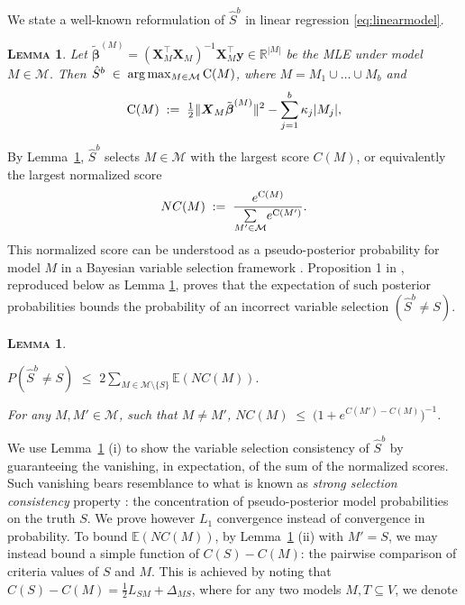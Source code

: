 \documentclass[aos]{imsart}
\theoremstyle{plain}
\newtheorem{lem}[thm]{\textsc{Lemma}}
\newcommand{\E}{\mathbb{E}}
\newcommand{\R}{\mathbb{R}}
\newcommand{\M}{\mathcal{M}}
\newcommand{\bs}{\boldsymbol}
\begin{document}
We state a well-known
reformulation of $\hat S^b$ in linear regression \eqref{eq:linearmodel}. 
\begin{lem}\label{lem:useful-reformulation} Let $\tilde{\bs \beta}^{(M)}= (\bs X_{\!\!M}^\top \bs X_{\!\!M})^{-1}\bs X_{\!\!M}^\top\bs y \in \R^{|M|}$ be the MLE under model $M\in \M$. Then $\hat S^b\;\in\;\arg\max_{M\in \M} {\rm C}(M)$, where $M=M_1\cup \ldots\cup M_b$ and
\begin{equation}\label{eq:CM}
    {\rm C}(M)\;: =\;\tfrac{1}{2}\|\bs X_M\tilde{\bs\beta}^{(M)}\|^2-\sum_{j=1}^b\kappa_j |M_j|,
\end{equation}
\end{lem}
By Lemma~\ref{lem:useful-reformulation}, $\hat S^b$ selects
$M\in \M$ with the largest score $C(M)$, or equivalently the largest normalized score
\begin{equation}\label{eq:normalizedscore}
    NC(M)\;:=\;\frac{e^{{\rm C}(M)}}{\underset{M' \in \M}{\sum} e^{{\rm C}(M')}}.
\end{equation}
This normalized score can be understood as a pseudo-posterior probability for model $M$ in a Bayesian variable selection framework \citep{BIC}.
Proposition 1 in \cite{rossell2022concentration}, reproduced below as Lemma \ref{lem:L0toL1convergence}, proves that the expectation of such posterior probabilities bounds the probability of an incorrect variable selection $(\hat S^b\neq S)$. 

\begin{lem}\label{lem:L0toL1convergence}
\begin{longlist}
\item 
$P(\hat{S}^{b} \neq S) \,\,\leq \,\, 2 \sum_{M \in \M\setminus \{S\}} \E\left(NC(M)\right).$
\item  For any $M,M'\in\M$, such that $M\neq M'$, 
$NC(M)\;\leq \;\big(1+e^{C(M')-C(M)}\big)^{-1}$.
\end{longlist}
\end{lem}
We use  Lemma~\ref{lem:L0toL1convergence} (i) to show the variable selection consistency of $\hat S^b$ by guaranteeing the vanishing, in expectation, of the sum of the normalized scores. Such vanishing bears resemblance to what is known as \textit{strong selection consistency} property \citep{narisettyhe2014}: the concentration of pseudo-posterior model probabilities on the truth $S$. We prove however $L_1$ convergence instead of convergence in probability.
To bound $\E(NC(M))$, by Lemma~\ref{lem:L0toL1convergence} (ii) with $M'=S$, we may instead bound a simple function of $C(S)-C(M)$: the pairwise comparison of criteria values of $S$ and $M$. 
This is achieved by noting that $C(S)-C(M)=\tfrac12 L_{SM}+\Delta_{MS}$, where for any two models $M,T\subseteq V$, we denote
\end{document}

